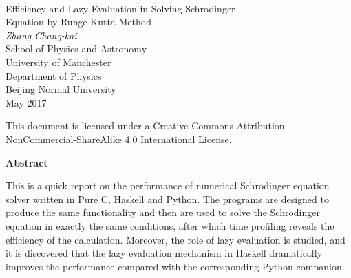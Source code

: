 \documentclass[11pt]{article}
\begin{document}
\begin{titlepage}

\begin{center}

~

\vspace{1.5cm}


{\huge Efficiency and Lazy Evaluation in Solving Schrodinger\\[0.3cm] Equation by Runge-Kutta Method}\\[1.2cm] 

\textit{\Large Zhang Chang-kai}\\[0.3cm] 

School of Physics and Astronomy~\\

University of Manchester~\\[0.3cm]

Department of Physics~\\

Beijing Normal University~\\[0.3cm]

May 2017~\\[1cm]

 
\begin{minipage}{0.7\textwidth}
This document is licensed under a Creative Commons Attribution-NonCommercial-ShareAlike 4.0 International License. \ccbyncsa
\end{minipage}

\end{center}

\vspace{2cm}


{\Large \textbf{Abstract}}~\\

\begin{center}
\begin{minipage}{0.85\textwidth}

This is a quick report on the performance of numerical Schrodinger equation solver written in Pure C, Haskell and Python. The programs are designed to produce the same functionality and then are used to solve the Schrodinger equation in exactly the same conditions, after which time profiling reveals the efficiency of the calculation. Moreover, the role of lazy evaluation is studied, and it is discovered that the lazy evaluation mechanism in Haskell dramatically improves the performance compared with the corresponding Python companion.
\end{minipage}
\end{center}

\end{titlepage}
\end{document}
